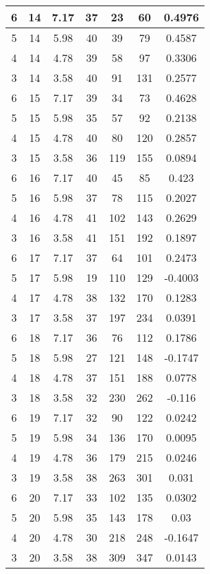 \documentclass[letterpaper, 12pt]{article}
\begin{document}
\begin{longtable}{|c|c|c|c|c|c|c|}
\hline
6 & 14 & 7.17 & 37 & 23 & 60 & 0.4976 \\
\hline
5 & 14 & 5.98 & 40 & 39 & 79 & 0.4587 \\
\hline
4 & 14 & 4.78 & 39 & 58 & 97 & 0.3306 \\
\hline
3 & 14 & 3.58 & 40 & 91 & 131 & 0.2577 \\
\hline
6 & 15 & 7.17 & 39 & 34 & 73 & 0.4628 \\
\hline
5 & 15 & 5.98 & 35 & 57 & 92 & 0.2138 \\
\hline
4 & 15 & 4.78 & 40 & 80 & 120 & 0.2857 \\
\hline
3 & 15 & 3.58 & 36 & 119 & 155 & 0.0894 \\
\hline
6 & 16 & 7.17 & 40 & 45 & 85 & 0.423 \\
\hline
5 & 16 & 5.98 & 37 & 78 & 115 & 0.2027 \\
\hline
4 & 16 & 4.78 & 41 & 102 & 143 & 0.2629 \\
\hline
3 & 16 & 3.58 & 41 & 151 & 192 & 0.1897 \\
\hline
6 & 17 & 7.17 & 37 & 64 & 101 & 0.2473 \\
\hline
5 & 17 & 5.98 & 19 & 110 & 129 & -0.4003 \\
\hline
4 & 17 & 4.78 & 38 & 132 & 170 & 0.1283 \\
\hline
3 & 17 & 3.58 & 37 & 197 & 234 & 0.0391 \\
\hline
6 & 18 & 7.17 & 36 & 76 & 112 & 0.1786 \\
\hline
5 & 18 & 5.98 & 27 & 121 & 148 & -0.1747 \\
\hline
4 & 18 & 4.78 & 37 & 151 & 188 & 0.0778 \\
\hline
3 & 18 & 3.58 & 32 & 230 & 262 & -0.116 \\
\hline
6 & 19 & 7.17 & 32 & 90 & 122 & 0.0242 \\
\hline
5 & 19 & 5.98 & 34 & 136 & 170 & 0.0095 \\
\hline
4 & 19 & 4.78 & 36 & 179 & 215 & 0.0246 \\
\hline
3 & 19 & 3.58 & 38 & 263 & 301 & 0.031 \\
\hline
6 & 20 & 7.17 & 33 & 102 & 135 & 0.0302 \\
\hline
5 & 20 & 5.98 & 35 & 143 & 178 & 0.03 \\
\hline
4 & 20 & 4.78 & 30 & 218 & 248 & -0.1647 \\
\hline
3 & 20 & 3.58 & 38 & 309 & 347 & 0.0143 \\
\hline
\end{longtable}
\end{document}
